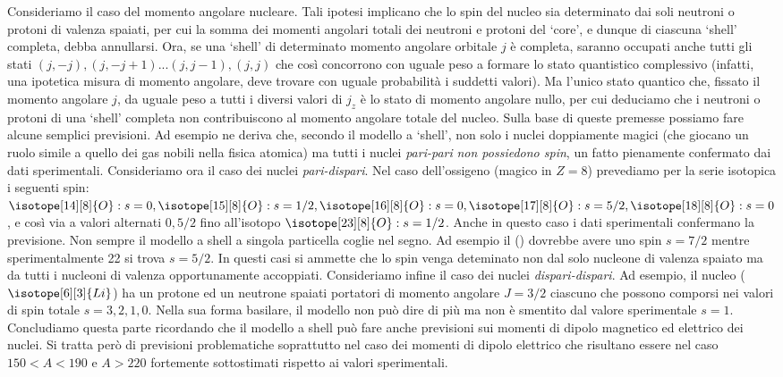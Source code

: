 Consideriamo il caso del momento
angolare nucleare. Tali ipotesi implicano
che lo spin del nucleo sia determinato dai
soli neutroni o protoni di valenza spaiati,
per cui la somma dei momenti angolari
totali dei neutroni e protoni del ‘core’, e
dunque di ciascuna ‘shell’ completa,
debba annullarsi.
Ora, se una ‘shell’ di determinato
momento angolare orbitale $j$ è
completa, saranno occupati anche tutti
gli stati $(j,-j), (j,-j+1)...(j,j-1), (j,j)$ che così
concorrono con uguale peso a formare lo
stato quantistico complessivo (infatti, una
ipotetica misura di momento angolare,
deve trovare con uguale probabilità i
suddetti valori). Ma l’unico stato quantico
che, fissato il momento angolare $j$, da
uguale peso a tutti i diversi valori di $j_{z}$ è lo
stato di momento angolare nullo, per cui
deduciamo che i neutroni o protoni di una
‘shell’ completa non contribuiscono al
momento angolare totale del nucleo.
Sulla base di queste premesse possiamo fare alcune semplici previsioni.
Ad esempio ne deriva che, secondo il modello a ‘shell’, non solo i nuclei doppiamente magici (che giocano un ruolo simile a quello dei gas nobili nella fisica atomica) ma tutti i nuclei \emph{pari-pari} \emph{non possiedono spin}, un fatto pienamente confermato dai dati sperimentali.
Consideriamo ora il caso dei nuclei \emph{pari-dispari}.
Nel caso dell’ossigeno (magico in $Z=8$) prevediamo per la serie isotopica i seguenti spin: $\isotope[14][8]{O}: s= 0,
\isotope[15][8]{O}: s= 1/2, \isotope[16][8]{O}: s= 0, \isotope[17][8]{O}: s= 5/2, \isotope[18][8]{O}: s= 0$, e così via a valori
alternati $0, 5/2$ fino all’isotopo $\isotope[23][8]{O}: s= 1/2$.
Anche in questo caso i dati sperimentali confermano la previsione.
Non sempre il modello a shell a singola particella coglie nel segno. Ad
esempio il () dovrebbe avere uno spin $s=7/2$ mentre sperimentalmente 22
si trova $s=5/2$. In questi casi si ammette che lo spin venga deteminato non
dal solo nucleone di valenza spaiato ma da tutti i nucleoni di valenza
opportunamente accoppiati.
Consideriamo infine il caso dei nuclei \emph{dispari-dispari}. Ad esempio, il nucleo
($\isotope[6][3]{Li}$) ha un protone ed un neutrone spaiati portatori di momento angolare
$J=3/2$ ciascuno che possono comporsi nei valori di spin totale $s=3,2,1,0$.
Nella sua forma basilare, il modello non può dire di più ma non è smentito dal valore sperimentale $s=1$.
Concludiamo questa parte ricordando che il modello a shell può fare anche previsioni sui momenti di dipolo magnetico ed elettrico dei nuclei.
Si tratta però di previsioni problematiche soprattutto nel caso dei momenti di dipolo elettrico che risultano essere nel caso $150<A<190$ e $A>220$ fortemente sottostimati rispetto ai valori sperimentali.
